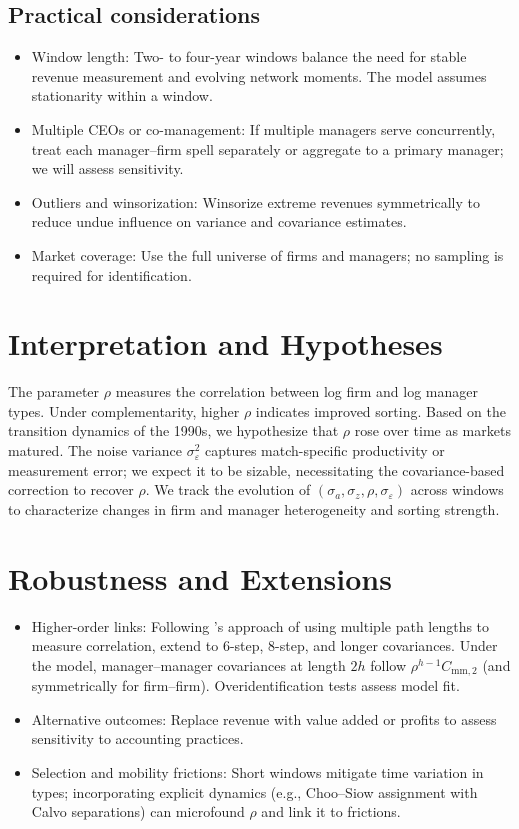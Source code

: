 \documentclass[11pt]{article}
\begin{document}
\subsection{Practical considerations}
\begin{itemize}
  \item Window length: Two- to four-year windows balance the need for stable revenue measurement and evolving network moments. The model assumes stationarity within a window.
  \item Multiple CEOs or co-management: If multiple managers serve concurrently, treat each manager--firm spell separately or aggregate to a primary manager; we will assess sensitivity.
  \item Outliers and winsorization: Winsorize extreme revenues symmetrically to reduce undue influence on variance and covariance estimates.
  \item Market coverage: Use the full universe of firms and managers; no sampling is required for identification.
\end{itemize}

\section{Interpretation and Hypotheses}
The parameter $\rho$ measures the correlation between log firm and log manager types. Under complementarity, higher $\rho$ indicates improved sorting. Based on the transition dynamics of the 1990s, we hypothesize that $\rho$ rose over time as markets matured. The noise variance $\sigma_\varepsilon^2$ captures match-specific productivity or measurement error; we expect it to be sizable, necessitating the covariance-based correction to recover $\rho$. We track the evolution of $(\sigma_a, \sigma_z, \rho, \sigma_\varepsilon)$ across windows to characterize changes in firm and manager heterogeneity and sorting strength.

\section{Robustness and Extensions}
\begin{itemize}
  \item Higher-order links: Following \citet{Clark2023}'s approach of using multiple path lengths to measure correlation, extend to 6-step, 8-step, and longer covariances. Under the model, manager--manager covariances at length $2h$ follow $\rho^{h-1} C_{\text{mm},2}$ (and symmetrically for firm--firm). Overidentification tests assess model fit.
  \item Alternative outcomes: Replace revenue with value added or profits to assess sensitivity to accounting practices.
  \item Selection and mobility frictions: Short windows mitigate time variation in types; incorporating explicit dynamics (e.g., Choo--Siow assignment with Calvo separations) can microfound $\rho$ and link it to frictions.
\end{itemize}
\end{document}
